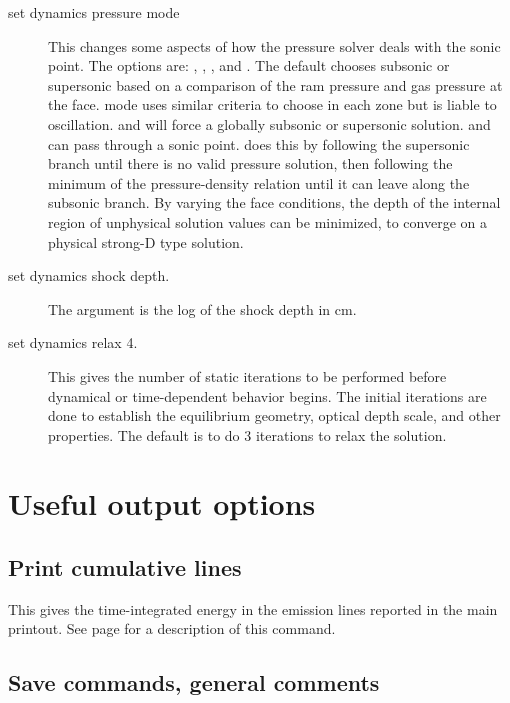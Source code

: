 \begin{shaded}
\begin{description}
\item[set dynamics pressure mode] This changes some aspects
of how the pressure
solver deals with the sonic point.  The options are: ,
,
, and .
The default chooses subsonic or supersonic based
on a comparison of the ram pressure and gas pressure at the face.
mode uses similar criteria to choose in each zone but is liable to
oscillation.   and  will force a globally subsonic or
supersonic solution.
 and  can pass through a
sonic point.
 does this by following the supersonic branch
until there is no valid
pressure solution, then following the minimum of the pressure-density
relation until it can leave along the subsonic branch.
By varying the face
conditions, the depth of the internal region of
unphysical solution values
can be minimized, to converge on a physical strong-D type solution.

\item[set dynamics shock depth.]  The argument is
the log of the shock depth in cm.

\item[set dynamics relax 4.]  
This gives the number of static iterations
to be performed before
dynamical or time-dependent behavior begins.
The initial iterations are
done to establish the equilibrium geometry, optical depth scale, and
other properties.
The default is to do 3 iterations to relax the solution.
\end{description}
\end{shaded}

\section{Useful output options}

\subsection{Print cumulative lines}

This gives the time-integrated energy in the emission lines
reported in the main printout.
See page \pageref{sec:CommandPrintLineCumulative} for a description
of this command.

\subsection{Save commands, general comments}

